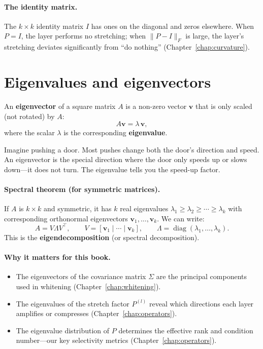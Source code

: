 \documentclass[11pt, twoside, openright]{memoir}
\begin{document}
\paragraph{The identity matrix.}
The $k \times k$ identity matrix $I$ has ones on the diagonal and zeros
elsewhere.  When $P = I$, the layer performs no stretching; when
$\|P - I\|_F$ is large, the layer's stretching deviates significantly from
``do nothing'' (Chapter~\ref{chap:curvature}).

\section{Eigenvalues and eigenvectors}
\label{sec:eigen}

An \textbf{eigenvector} of a square matrix $A$ is a non-zero vector
$\mathbf{v}$ that is only scaled (not rotated) by $A$:
\[
  A\mathbf{v} = \lambda\,\mathbf{v},
\]
where the scalar $\lambda$ is the corresponding \textbf{eigenvalue}.

\begin{analogy}
Imagine pushing a door.  Most pushes change both the door's direction and
speed.  An eigenvector is the special direction where the door only speeds
up or slows down---it does not turn.  The eigenvalue tells you the
speed-up factor.
\end{analogy}

\paragraph{Spectral theorem (for symmetric matrices).}
If $A$ is $k\times k$ and symmetric, it has $k$ real eigenvalues
$\lambda_1 \geq \lambda_2 \geq \cdots \geq \lambda_k$ with corresponding
orthonormal eigenvectors $\mathbf{v}_1,\ldots,\mathbf{v}_k$.  We can write:
\[
  A = V \Lambda V^\top, \qquad
  V = [\mathbf{v}_1 \mid \cdots \mid \mathbf{v}_k], \qquad
  \Lambda = \operatorname{diag}(\lambda_1,\ldots,\lambda_k).
\]
This is the \textbf{eigendecomposition} (or spectral decomposition).

\paragraph{Why it matters for this book.}
\begin{itemize}[nosep]
  \item The eigenvectors of the covariance matrix $\Sigma$ are the
    principal components used in whitening (Chapter~\ref{chap:whitening}).
  \item The eigenvalues of the stretch factor $P^{(l)}$ reveal which
    directions each layer amplifies or compresses
    (Chapter~\ref{chap:operators}).
  \item The eigenvalue distribution of $P$ determines the effective rank
    and condition number---our key selectivity metrics
    (Chapter~\ref{chap:operators}).
\end{itemize}
\end{document}
